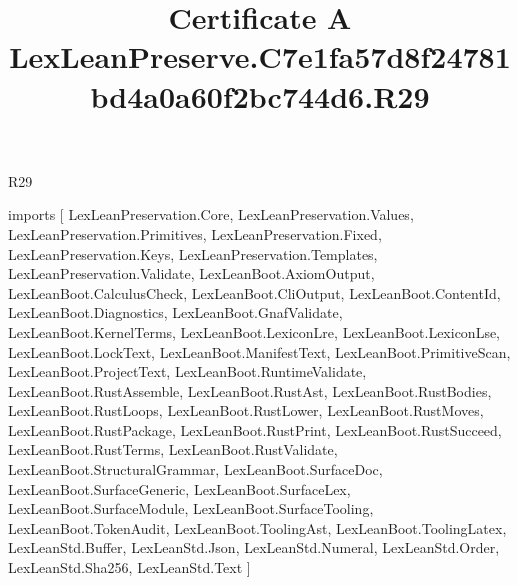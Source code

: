 \begin{lexlean}{R29}
\title{Certificate A LexLeanPreserve.C7e1fa57d8f24781bd4a0a60f2bc744d6.R29}
\begin{coremodule}
imports [
  LexLeanPreservation.Core,
  LexLeanPreservation.Values,
  LexLeanPreservation.Primitives,
  LexLeanPreservation.Fixed,
  LexLeanPreservation.Keys,
  LexLeanPreservation.Templates,
  LexLeanPreservation.Validate,
  LexLeanBoot.AxiomOutput,
  LexLeanBoot.CalculusCheck,
  LexLeanBoot.CliOutput,
  LexLeanBoot.ContentId,
  LexLeanBoot.Diagnostics,
  LexLeanBoot.GnafValidate,
  LexLeanBoot.KernelTerms,
  LexLeanBoot.LexiconLre,
  LexLeanBoot.LexiconLse,
  LexLeanBoot.LockText,
  LexLeanBoot.ManifestText,
  LexLeanBoot.PrimitiveScan,
  LexLeanBoot.ProjectText,
  LexLeanBoot.RuntimeValidate,
  LexLeanBoot.RustAssemble,
  LexLeanBoot.RustAst,
  LexLeanBoot.RustBodies,
  LexLeanBoot.RustLoops,
  LexLeanBoot.RustLower,
  LexLeanBoot.RustMoves,
  LexLeanBoot.RustPackage,
  LexLeanBoot.RustPrint,
  LexLeanBoot.RustSucceed,
  LexLeanBoot.RustTerms,
  LexLeanBoot.RustValidate,
  LexLeanBoot.StructuralGrammar,
  LexLeanBoot.SurfaceDoc,
  LexLeanBoot.SurfaceGeneric,
  LexLeanBoot.SurfaceLex,
  LexLeanBoot.SurfaceModule,
  LexLeanBoot.SurfaceTooling,
  LexLeanBoot.TokenAudit,
  LexLeanBoot.ToolingAst,
  LexLeanBoot.ToolingLatex,
  LexLeanStd.Buffer,
  LexLeanStd.Json,
  LexLeanStd.Numeral,
  LexLeanStd.Order,
  LexLeanStd.Sha256,
  LexLeanStd.Text
]


\end{coremodule}
\end{lexlean}
